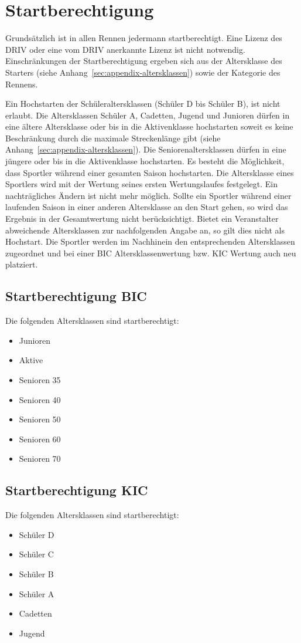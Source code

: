 \section{Startberechtigung}
Grundsätzlich ist in allen Rennen jedermann startberechtigt. Eine Lizenz des DRIV oder eine vom DRIV anerkannte Lizenz ist nicht notwendig. Einschränkungen der Startberechtigung ergeben sich aus der Altersklasse des Starters (siehe Anhang~\ref{sec:appendix-altersklassen}) sowie der Kategorie des Rennens.

Ein Hochstarten der Schüleraltersklassen (Schüler D bis Schüler B), ist nicht erlaubt. Die Altersklassen Schüler A, Cadetten, Jugend und Junioren dürfen in eine ältere Altersklasse oder bis in die Aktivenklasse hochstarten soweit es keine Beschränkung durch die maximale Streckenlänge gibt (siehe Anhang~\ref{sec:appendix-altersklassen}). Die Seniorenaltersklassen dürfen in eine jüngere oder bis in die Aktivenklasse hochstarten.
Es besteht die Möglichkeit, dass Sportler während einer gesamten Saison hochstarten. Die Altersklasse eines Sportlers wird mit der Wertung seines ersten Wertungslaufes festgelegt. Ein nachträgliches Ändern ist nicht mehr möglich. Sollte ein Sportler während einer laufenden Saison in einer anderen Altersklasse an den Start gehen, so wird das Ergebnis in der Gesamtwertung nicht berücksichtigt. Bietet ein Veranstalter abweichende Altersklassen zur nachfolgenden Angabe an, so gilt dies nicht als Hochstart. Die Sportler werden im Nachhinein den entsprechenden Altersklassen zugeordnet und bei einer BIC Altersklassenwertung bzw. KIC Wertung auch neu platziert.

\subsection{Startberechtigung BIC}
Die folgenden Altersklassen sind startberechtigt:
\begin{itemize}
	\item Junioren
	\item Aktive
	\item Senioren 35
	\item Senioren 40
	\item Senioren 50
	\item Senioren 60
	\item Senioren 70
\end{itemize}

\subsection{Startberechtigung KIC}
Die folgenden Altersklassen sind startberechtigt:
\begin{itemize}
	\item Schüler D
	\item Schüler C
	\item Schüler B
	\item Schüler A
	\item Cadetten
	\item Jugend
\end{itemize}

